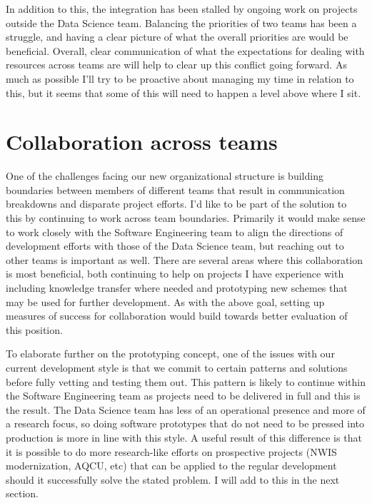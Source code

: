 \documentclass{article}
\begin{document}
In addition to this, the integration has been stalled by ongoing work on projects outside the Data Science team.
Balancing the priorities of two teams has been a struggle, and having a clear picture of what the overall priorities are would be beneficial.
Overall, clear communication of what the expectations for dealing with resources across teams are will help to clear up this conflict going forward.
As much as possible I'll try to be proactive about managing my time in relation to this, but it seems that some of this will need to happen a level above where I sit.

\section{Collaboration across teams}

One of the challenges facing our new organizational structure is building boundaries between members of different teams that result in communication breakdowns and disparate project efforts.
I'd like to be part of the solution to this by continuing to work across team boundaries.
Primarily it would make sense to work closely with the Software Engineering team to align the directions of development efforts with those of the Data Science team, but reaching out to other teams is important as well.
There are several areas where this collaboration is most beneficial, both continuing to help on projects I have experience with including knowledge transfer where needed and prototyping new schemes that may be used for further development.
As with the above goal, setting up measures of success for collaboration would build towards better evaluation of this position.

To elaborate further on the prototyping concept, one of the issues with our current development style is that we commit to certain patterns and solutions before fully vetting and testing them out.
This pattern is likely to continue within the Software Engineering team as projects need to be delivered in full and this is the result.
The Data Science team has less of an operational presence and more of a research focus, so doing software prototypes that do not need to be pressed into production is more in line with this style.
A useful result of this difference is that it is possible to do more research-like efforts on prospective projects (NWIS modernization, AQCU, etc) that can be applied to the regular development should it successfully solve the stated problem.
I will add to this in the next section.
\end{document}

